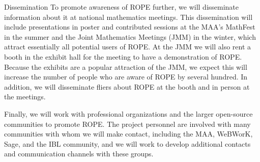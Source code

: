\documentclass[11pt]{article}
\begin{document}
\begin{section}{Dissemination}
To promote awareness of ROPE further, we will disseminate
information about it at national mathematics meetings.  This
dissemination will include presentations in poster and contributed
sessions at the MAA's MathFest in the summer and the Joint Mathematics
Meetings (JMM) in the winter, which attract essentially all potential
users of ROPE.  At the JMM we will also rent a booth in the exhibit hall
for the meeting to have a demonstration of ROPE.  Because the exhibits
are a popular attraction of the JMM, we expect this will increase the
number of people who are aware of ROPE by several hundred.  In
addition, we will disseminate fliers about ROPE at the booth and in
person at the meetings.

Finally, we will work with professional organizations and the larger
open-source communities to promote ROPE.  The project personnel are
involved with many communities with whom we will make contact, including
the MAA, WeBWorK, Sage, and the IBL community, and we will work to develop additional contacts
and communication channels with these groups.

\end{section}
\end{document}

